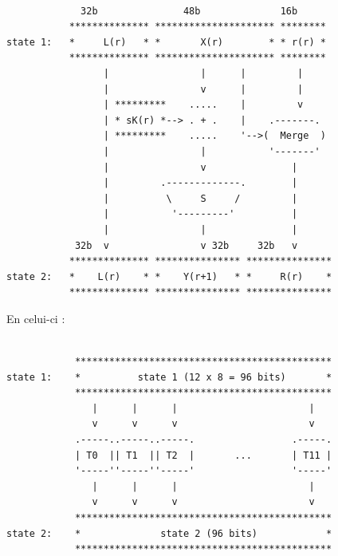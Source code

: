 \documentclass[a4paper,12pt]{article}
\begin{document}
\begin{Verbatim}[samepage=true]
			
             32b               48b              16b
           ************** ********************* ********
state 1:   *     L(r)   * *       X(r)        * * r(r) *
           ************** ********************* ********
                 |                |      |         |
                 |                v      |         |
                 | *********    .....    |         v
                 | * sK(r) *--> . + .    |    .-------.
                 | *********    .....    '-->(  Merge  )
                 |                |           '-------'
                 |                v               |
                 |         .-------------.        |
                 |          \     S     /         |
                 |           '---------'          |
                 |                |               |
            32b  v                v 32b     32b   v
           ************** *************** ***************
state 2:   *    L(r)    * *    Y(r+1)   * *     R(r)    *
           ************** *************** ***************

\end{Verbatim}		

En celui-ci :

\begin{Verbatim}[samepage=true]

            *********************************************
state 1:    *          state 1 (12 x 8 = 96 bits)       *
            *********************************************
               |      |      |                       |
               v      v      v                       v
            .-----..-----..-----.                 .-----.
            | T0  || T1  || T2  |       ...       | T11 |
            '-----''-----''-----'                 '-----'
               |      |      |                       |
               v      v      v                       v
            *********************************************
state 2:    *              state 2 (96 bits)            *
            *********************************************			
			
\end{Verbatim}
		
\end{document}
